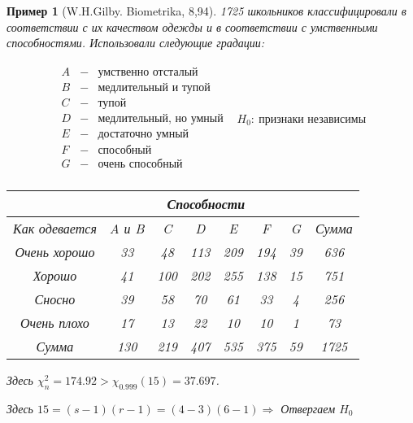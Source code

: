 \documentclass[12pt]{article}
\newtheorem*{example}{Пример}
\theoremstyle{basic_theorem}
\theoremstyle{name_theorem}
\begin{document}
    \begin{example}[W.H.Gilby. Biometrika, 8,94]
        1725 школьников классифицировали в соответствии с их
        качеством одежды и в соответствии с умственными способностями.
        Использовали следующие градации:
        
        \[
        \begin{array}{lr}
            \begin{array}{lcl}
                A &-& \text{умственно отсталый} \\
                B &-& \text{медлительный и тупой} \\
                C &-& \text{тупой} \\
                D &-& \text{медлительный, но умный} \\
                E &-& \text{достаточно умный} \\
                F &-& \text{способный} \\
                G &-& \text{очень способный} \\
            \end{array} & 
            \boxed{H_0:\ \text{признаки независимы}}
        \end{array}
        \]
        \newpage
        \begin{table}[h!]
            \centering
            \begin{tabular}{ c|c|c|c|c|c|c|c }
                & \multicolumn{6}{|c|}{Способности} & \\ \hline
                Как одевается & A и B & C   & D   & E   & F   & G  & Сумма \\ \hline
                Очень хорошо  &  33   & 48  & 113 & 209 & 194 & 39 & 636   \\ \hline
                Хорошо        &  41   & 100 & 202 & 255 & 138 & 15 & 751   \\ \hline
                Сносно        &  39   & 58  & 70  & 61  & 33  & 4  & 256   \\ \hline
                Очень плохо   &  17   & 13  & 22  & 10  & 10  & 1  & 73    \\ \hline
                Сумма         &  130  & 219 & 407 & 535 & 375 & 59 & 1725
            \end{tabular}
        \end{table}
        Здесь $\chi_n^2=174.92>\chi_{0.999}(15)=37.697$. \par
        Здесь $15 = (s-1)(r-1) = (4-3)(6-1) \Rightarrow$ Отвергаем $H_0$
    \end{example}
\end{document}
